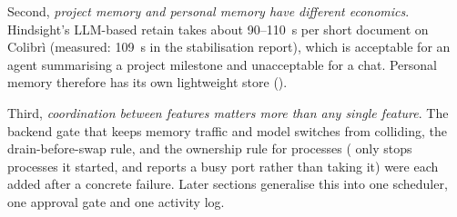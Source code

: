 Second, \emph{project memory and personal memory have different economics}. Hindsight's LLM-based retain takes about 90--110~s per short document on Colibr\`i (measured: 109~s in the stabilisation report), which is acceptable for an agent summarising a project milestone and unacceptable for a chat. Personal memory therefore has its own lightweight store ().

Third, \emph{coordination between features matters more than any single feature}. The backend gate that keeps memory traffic and model switches from colliding, the drain-before-swap rule, and the ownership rule for processes (\hivi{} only stops processes it started, and reports a busy port rather than taking it) were each added after a concrete failure. Later sections generalise this into one scheduler, one approval gate and one activity log.
